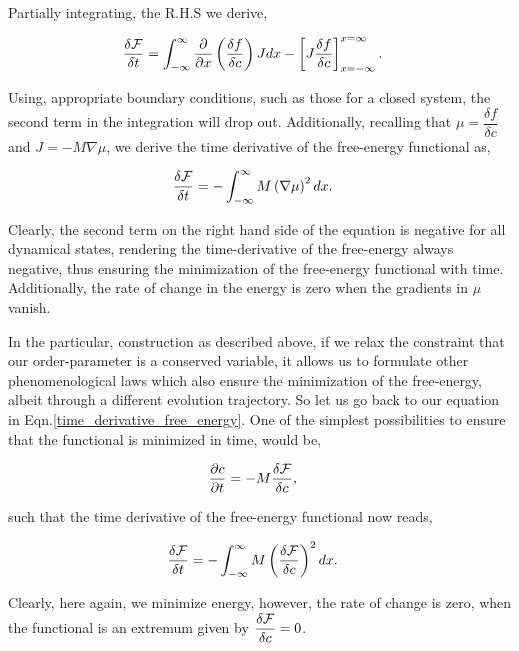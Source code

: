 \documentclass[english]{iambook}
\begin{document}
Partially integrating, the R.H.S  we derive, 

\begin{align}
 \dfrac{\delta {\cal F}}{\delta t} &= \int_{-\infty}^{\infty} \dfrac{\partial}{\partial x}\left(\dfrac{\delta f}{\delta c}\right) J dx 
 - \left[J\dfrac{\delta f}{\delta c}\right]_{x=-\infty}^{x=\infty}.
\end{align}

Using, appropriate boundary conditions, such as those for a closed system, the second term in the integration 
will drop out. Additionally, recalling that $\mu=\dfrac{\delta f}{\delta c}$ and $J=-M\nabla \mu$, we 
derive the time derivative of the free-energy functional as, 

\begin{align}
 \dfrac{\delta {\cal F}}{\delta t} &= -\int_{-\infty}^{\infty}M\left(\nabla \mu\right)^{2}dx.
\end{align}

Clearly, the second term on the right hand side of the equation is negative for all dynamical states, 
rendering the time-derivative of the free-energy always negative, thus ensuring the minimization of
the free-energy functional with time. Additionally, the rate of change in the energy is zero when 
the gradients in $\mu$ vanish.

In the particular, construction as described above, if we relax the constraint that 
our order-parameter is a conserved variable, it allows us to formulate other phenomenological 
laws which also ensure the minimization of the free-energy, albeit through a different evolution
trajectory. So let us go back to our equation in Eqn.\ref{time_derivative_free_energy}.
One of the simplest possibilities to ensure that the functional is minimized in time, 
would be, 

\begin{align}
 \dfrac{\partial c}{\partial t} &= -M \dfrac{\delta {\cal F}}{\delta c},
\end{align}

such that the time derivative of the free-energy functional now reads, 

\begin{align}
 \dfrac{\delta {\cal F}}{\delta t} &= -\int_{-\infty}^{\infty}M\left(\dfrac{\delta {\cal F}}{\delta c}\right)^{2}dx.
\end{align}

Clearly, here again, we minimize energy, however, the rate of change is zero, 
when the functional is an extremum given by $\dfrac{\delta {\cal F}}{\delta c} = 0$.
\end{document}
